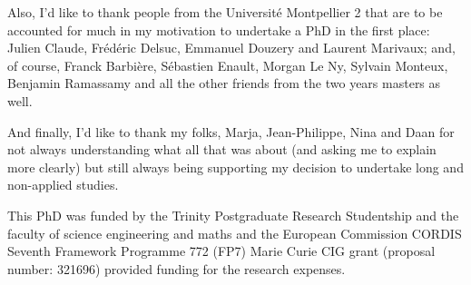 Also, I'd like to thank people from the Universit\'{e} Montpellier 2 that are to be accounted for much in my motivation to undertake a PhD in the first place:
Julien Claude, Fr\'{e}d\'{e}ric Delsuc, Emmanuel Douzery and Laurent Marivaux;
and, of course, Franck Barbi\`{e}re, S\'{e}bastien Enault, Morgan Le Ny, Sylvain Monteux, Benjamin Ramassamy and all the other friends from the two years masters as well.

And finally, I'd like to thank my folks, Marja, Jean-Philippe, Nina and Daan for not always understanding what all that was about (and asking me to explain more clearly) but still always being supporting my decision to undertake long and non-applied studies.

This PhD was funded by the Trinity Postgraduate Research Studentship and the faculty of science engineering and maths and the European Commission CORDIS Seventh Framework Programme 772 (FP7) Marie Curie CIG grant (proposal number: 321696) provided funding for the research expenses.



